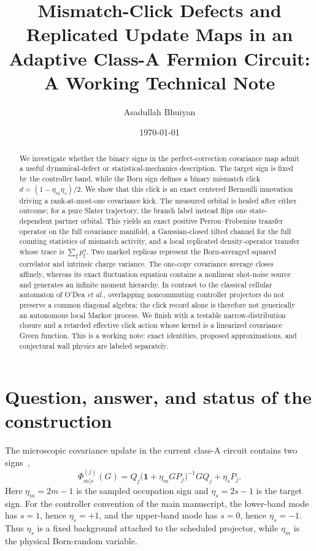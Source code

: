 \documentclass[
  aps,prx,twocolumn,superscriptaddress,longbibliography,
  nofootinbib,floatfix
]{revtex4-2}
\newcommand{\Id}{\mathbf{1}}
\theoremstyle{plain}
\theoremstyle{definition}
\begin{document}
\title{Mismatch-Click Defects and Replicated Update Maps in an Adaptive
Class-A Fermion Circuit: A Working Technical Note}
\author{Asadullah Bhuiyan}
\date{\today}

\begin{abstract}
We investigate whether the binary signs in the perfect-correction covariance
map admit a useful dynamical-defect or statistical-mechanics description.  The
target sign is fixed by the controller band, while the Born sign defines a
binary mismatch click
\(d=(1-\eta_m\eta_s)/2\).  We show that this click is an exact centered
Bernoulli innovation driving a rank-at-most-one covariance kick.  The measured orbital
is healed after either outcome; for a pure Slater trajectory, the branch label
instead flips one state-dependent partner orbital.  This yields an exact
positive Perron--Frobenius transfer operator on the full covariance manifold, a
Gaussian-closed tilted channel for the full counting statistics of mismatch
activity, and a local replicated density-operator transfer whose trace is
\(\sum_\xi p_\xi^n\).  Two marked replicas represent the Born-averaged squared
correlator and intrinsic charge variance.  The one-copy covariance average
closes affinely, whereas its exact fluctuation equation contains a nonlinear
shot-noise source and generates an infinite moment hierarchy.  In contrast to
the classical cellular automaton of O'Dea \emph{et al.}, overlapping
noncommuting controller projectors do not preserve a common diagonal algebra;
the click record alone is therefore not generically an autonomous local
Markov process.  We finish with a testable narrow-distribution closure and a
retarded effective click action whose kernel is a linearized covariance Green
function.  This is a working note: exact
identities, proposed approximations, and conjectural wall physics are labeled
separately.
\end{abstract}

\maketitle
\setcounter{tocdepth}{2}
\tableofcontents

\section{Question, answer, and status of the construction}
\label{sec:question}

The microscopic covariance update in the current class-A circuit
contains two signs~\cite{BhuiyanPanJian2026},
\begin{equation}
 \Phi_{m|s}^{(j)}(G)
 =Q_j\bigl(\Id+\eta_mGP_j\bigr)^{-1}GQ_j+\eta_sP_j.
 \label{eq:starting-map}
\end{equation}
Here \(\eta_m=2m-1\) is the sampled occupation sign and
\(\eta_s=2s-1\) is the target sign.  For the controller convention of the
main manuscript, the lower-band mode has \(s=1\), hence \(\eta_s=+1\), and
the upper-band mode has \(s=0\), hence \(\eta_s=-1\).  Thus \(\eta_s\) is a
fixed background attached to the scheduled projector, while \(\eta_m\) is the
physical Born-random variable.
\end{document}
